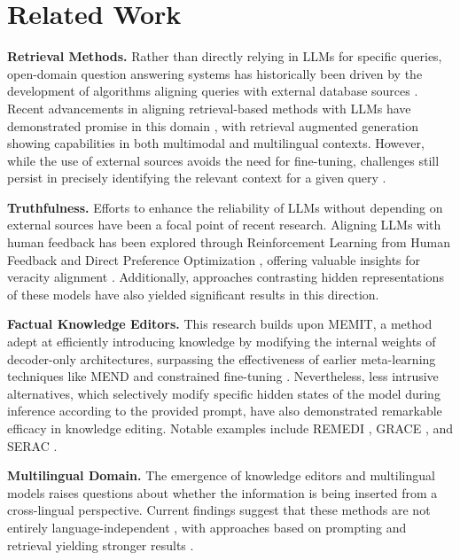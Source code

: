 \section{Related Work}
\textbf{Retrieval Methods.} Rather than directly relying in LLMs for specific queries, open-domain question answering systems has historically been driven by the development of algorithms aligning queries with external database sources \cite{BM25}. Recent advancements in aligning retrieval-based methods with LLMs have demonstrated promise in this domain \cite{dense_passage,GAR,RETRO}, with retrieval augmented generation \cite{RAG} showing capabilities in both multimodal \cite{Chen_multimodal,Chen_multimodal2,RAGmultimodal} and multilingual \cite{retrievalMulti} contexts. However, while the use of external sources avoids the need for fine-tuning, challenges still persist in precisely identifying the relevant context for a given query \cite{RAG_surv}.

\textbf{Truthfulness.} Efforts to enhance the reliability of LLMs without depending on external sources have been a focal point of recent research. Aligning LLMs with human feedback has been explored through Reinforcement Learning from Human Feedback \cite{RLHF2,RLHF} and Direct Preference Optimization \cite{DPO}, offering valuable insights for veracity alignment \cite{GRATH}. Additionally, approaches contrasting hidden representations of these models have also yielded significant results \cite{Contrastive_L,DOLA} in this direction.

\textbf{Factual Knowledge Editors.}
This research builds upon MEMIT, a method adept at efficiently introducing knowledge by modifying the internal weights of decoder-only architectures, surpassing the effectiveness of earlier meta-learning techniques like MEND \cite{MEND} and constrained fine-tuning \cite{FT_normal}. Nevertheless, less intrusive alternatives, which selectively modify specific hidden states of the model during inference according to the provided prompt, have also demonstrated remarkable efficacy in knowledge editing. Notable examples include REMEDI \cite{REMEDI}, GRACE \cite{Aging}, and SERAC \cite{serac}. 

\textbf{Multilingual Domain.}
The emergence of knowledge editors and multilingual models raises questions about whether the information is being inserted from a cross-lingual perspective. Current findings suggest that these methods are not entirely language-independent \cite{PolyglotOrNot,CrossLingual}, with approaches based on prompting and retrieval yielding stronger results \cite{IKE,retrievalMulti}. 


